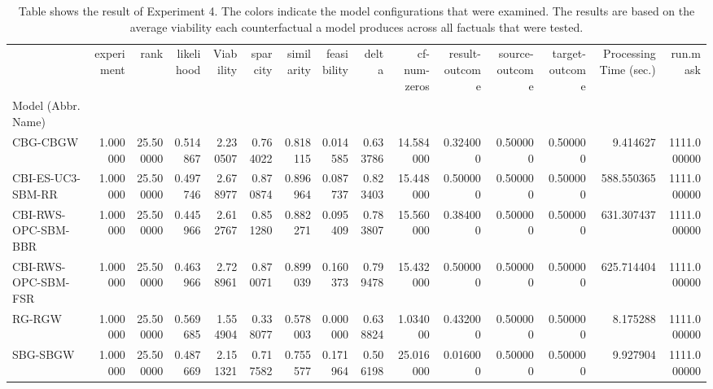\begin{table}
\caption{Table shows the result of Experiment 4. The colors indicate the model configurations that were examined. The results are based on the average viability each counterfactual a model produces across all factuals that were tested.}
\label{tbl:exp4-winner}
\begin{tabular}{lrrrrrrrrrrrrrr}
 & experiment & rank & likelihood & Viability & sparcity & similarity & feasibility & delta & cf-num-zeros & result-outcome & source-outcome & target-outcome & Processing Time (sec.) & run.mask \\
Model (Abbr. Name) &  &  &  &  &  &  &  &  &  &  &  &  &  &  \\
CBG-CBGW & 1.000000 & 25.500000 & 0.514867 & 2.230507 & 0.764022 & 0.818115 & 0.014585 & 0.633786 & 14.584000 & 0.324000 & 0.500000 & 0.500000 & 9.414627 & 1111.000000 \\
CBI-ES-UC3-SBM-RR & 1.000000 & 25.500000 & 0.497746 & 2.678977 & 0.870874 & 0.896964 & 0.087737 & 0.823403 & 15.448000 & 0.500000 & 0.500000 & 0.500000 & 588.550365 & 1111.000000 \\
CBI-RWS-OPC-SBM-BBR & 1.000000 & 25.500000 & 0.445966 & 2.612767 & 0.851280 & 0.882271 & 0.095409 & 0.783807 & 15.560000 & 0.384000 & 0.500000 & 0.500000 & 631.307437 & 1111.000000 \\
CBI-RWS-OPC-SBM-FSR & 1.000000 & 25.500000 & 0.463966 & 2.728961 & 0.870071 & 0.899039 & 0.160373 & 0.799478 & 15.432000 & 0.500000 & 0.500000 & 0.500000 & 625.714404 & 1111.000000 \\
RG-RGW & 1.000000 & 25.500000 & 0.569685 & 1.554904 & 0.338077 & 0.578003 & 0.000000 & 0.638824 & 1.034000 & 0.432000 & 0.500000 & 0.500000 & 8.175288 & 1111.000000 \\
SBG-SBGW & 1.000000 & 25.500000 & 0.487669 & 2.151321 & 0.717582 & 0.755577 & 0.171964 & 0.506198 & 25.016000 & 0.016000 & 0.500000 & 0.500000 & 9.927904 & 1111.000000 \\
\end{tabular}
\end{table}
